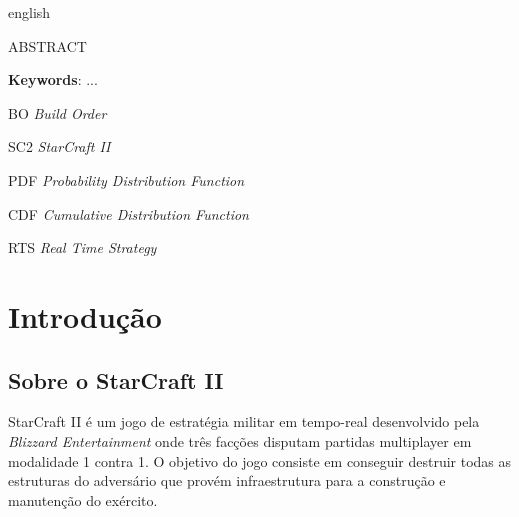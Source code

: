 \begin{resumo}[Abstract]
 \begin{otherlanguage*}{english}
	
	ABSTRACT
	
	\vspace{\onelineskip}
	\noindent 
	\textbf{Keywords}: ...
 \end{otherlanguage*}
\end{resumo}


\listoffigures*
\cleardoublepage

\listoftables*
\cleardoublepage

\begin{siglas}
	\item[BO]		\emph{Build Order}
	\item[SC2]		\emph{StarCraft II}
	\item[PDF]		\emph{Probability Distribution Function}
	\item[CDF]		\emph{Cumulative Distribution Function}
	\item[RTS]		\emph{Real Time Strategy}
\end{siglas}

\tableofcontents*
\cleardoublepage

\textual
	\chapter{Introdução}
		\section{Sobre o StarCraft II}

StarCraft II é um jogo de estratégia militar em tempo-real desenvolvido pela \textit{Blizzard Entertainment} onde três facções disputam partidas multiplayer em modalidade 1 contra 1. O objetivo do jogo consiste em conseguir destruir todas as estruturas do adversário que provém infraestrutura para a construção e manutenção do exército.

